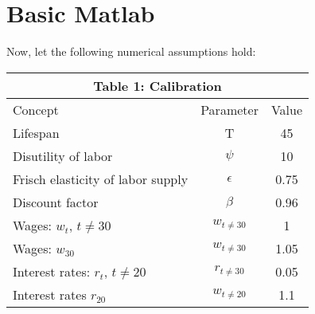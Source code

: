 \documentclass[11pt]{article}
\begin{document}
\clearpage
\section{Basic Matlab}
Now, let the following numerical assumptions hold:
\begin{table}[ht!]
\centering
\begin{tabular}{lcc}
\hline
\hline
\multicolumn{3}{c}{Table 1: Calibration}\\
\hline
Concept & Parameter & Value \\ 
Lifespan & T & 45 \\
Disutility of labor & $\psi$ & 10\\
Frisch elasticity of labor supply & $\epsilon$ & 0.75\\
Discount factor & $\beta$ & 0.96\\
Wages: $w_t$, $t\neq 30$ & $w_{t\neq30}$ & 1\\
Wages: $w_30$ & $w_{t\neq30}$ & 1.05\\
Interest rates: $r_t$, $t\neq 20$ & $r_{t\neq30}$ & 0.05\\
Interest rates $r_20$ & $w_{t\neq20}$ & 1.1\\
\hline
\hline
\end{tabular}
\end{table}
\end{document}
